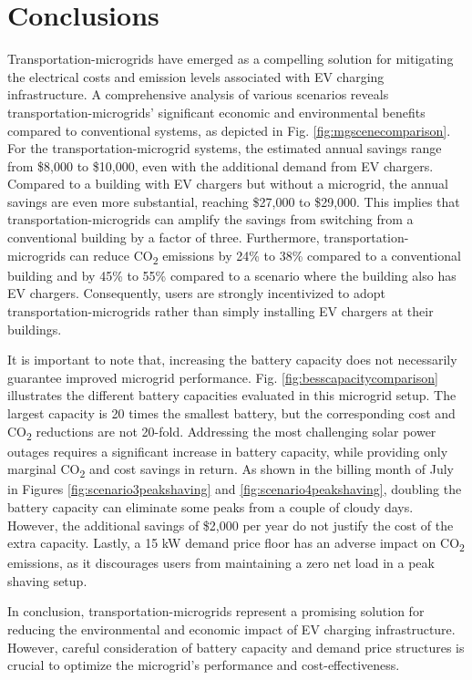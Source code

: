 \documentclass[conference]{IEEEtran}
\begin{document}
	\section{Conclusions}
		Transportation-microgrids have emerged as a compelling solution for mitigating the electrical costs and emission levels associated with EV charging infrastructure. A comprehensive analysis of various scenarios reveals transportation-microgrids' significant economic and environmental benefits compared to conventional systems, as depicted in Fig. \ref{fig:mgscenecomparison}. For the transportation-microgrid systems, the estimated annual savings range from \$8,000 to \$10,000, even with the additional demand from EV chargers. Compared to a building with EV chargers but without a microgrid, the annual savings are even more substantial, reaching \$27,000 to \$29,000. This implies that transportation-microgrids can amplify the savings from switching from a conventional building by a factor of three. Furthermore, transportation-microgrids can reduce CO\textsubscript{2} emissions by 24\% to 38\% compared to a conventional building and by 45\% to 55\% compared to a scenario where the building also has EV chargers. Consequently, users are strongly incentivized to adopt transportation-microgrids rather than simply installing EV chargers at their buildings. 
		
		It is important to note that, increasing the battery capacity does not necessarily guarantee improved microgrid performance. Fig. \ref{fig:besscapacitycomparison} illustrates the different battery capacities evaluated in this microgrid setup. The largest capacity is 20 times the smallest battery, but the corresponding cost and CO\textsubscript{2} reductions are not 20-fold. Addressing the most challenging solar power outages requires a significant increase in battery capacity, while providing only marginal CO\textsubscript{2} and cost savings in return. As shown in the billing month of July in Figures \ref{fig:scenario3peakshaving} and \ref{fig:scenario4peakshaving}, doubling the battery capacity can eliminate some peaks from a couple of cloudy days. However, the additional savings of \$2,000 per year do not justify the cost of the extra capacity. Lastly, a 15 kW demand price floor has an adverse impact on CO\textsubscript{2} emissions, as it discourages users from maintaining a zero net load in a peak shaving setup. 
		
		In conclusion, transportation-microgrids represent a promising solution for reducing the environmental and economic impact of EV charging infrastructure. However, careful consideration of battery capacity and demand price structures is crucial to optimize the microgrid's performance and cost-effectiveness.
\end{document}
